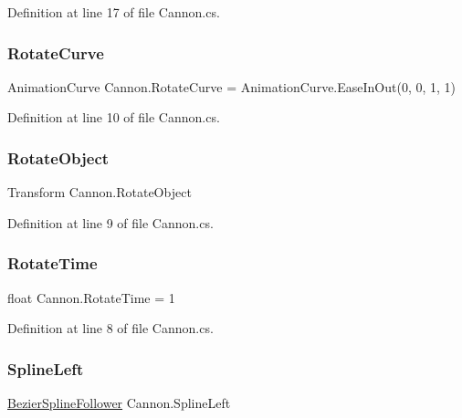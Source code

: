 Definition at line 17 of file Cannon.\+cs.

\mbox{\label{class_cannon_a5c22134c62741c089a8ae471c7afee29}} 
\subsubsection{\texorpdfstring{Rotate\+Curve}{RotateCurve}}
{\footnotesize\ttfamily Animation\+Curve Cannon.\+Rotate\+Curve = Animation\+Curve.\+Ease\+In\+Out(0, 0, 1, 1)}



Definition at line 10 of file Cannon.\+cs.

\mbox{\label{class_cannon_a058c26253647d4f92ddcb8da7ea5ec15}} 
\subsubsection{\texorpdfstring{Rotate\+Object}{RotateObject}}
{\footnotesize\ttfamily Transform Cannon.\+Rotate\+Object}



Definition at line 9 of file Cannon.\+cs.

\mbox{\label{class_cannon_a9516c36d3a448bad28896f332fcedf53}} 
\subsubsection{\texorpdfstring{Rotate\+Time}{RotateTime}}
{\footnotesize\ttfamily float Cannon.\+Rotate\+Time = 1}



Definition at line 8 of file Cannon.\+cs.

\mbox{\label{class_cannon_a6983ae781175cb879d1c4daacf0a72ff}} 
\subsubsection{\texorpdfstring{Spline\+Left}{SplineLeft}}
{\footnotesize\ttfamily \mbox{\hyperlink{class_bezier_spline_follower}{Bezier\+Spline\+Follower}} Cannon.\+Spline\+Left}



